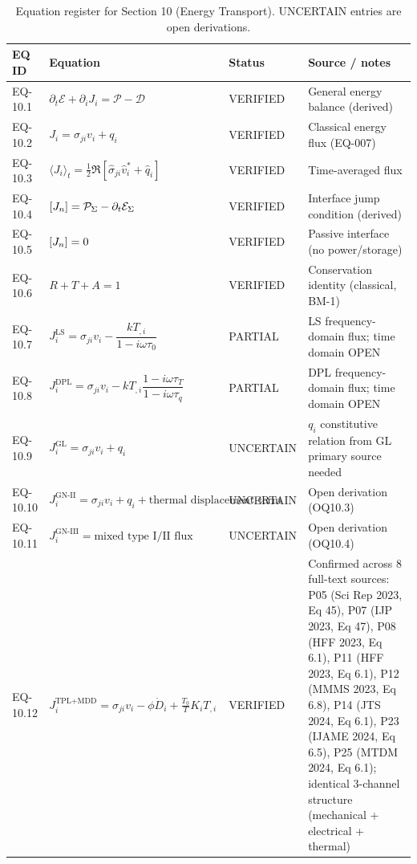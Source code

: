 \begin{table}[h]
\centering
\small
\caption{Equation register for Section 10 (Energy Transport). UNCERTAIN entries are open derivations.}
\label{tab:appA-sec10}
\begin{tabularx}{\textwidth}{@{}lXll@{}}
\toprule
\textbf{EQ ID} & \textbf{Equation} & \textbf{Status} & \textbf{Source / notes} \\
\midrule
EQ-10.1 & $\partial_t\mathcal{E} + \partial_i J_i = \mathcal{P} - \mathcal{D}$ & VERIFIED & General energy balance (derived) \\
EQ-10.2 & $J_i = \sigma_{ji}v_i + q_i$ & VERIFIED & Classical energy flux (EQ-007) \\
EQ-10.3 & $\langle J_i \rangle_t = \tfrac{1}{2}\Re[\hat{\sigma}_{ji}\hat{v}_i^* + \hat{q}_i]$ & VERIFIED & Time-averaged flux \\
EQ-10.4 & $\left[ J_n \right] = \mathcal{P}_\Sigma - \partial_t\mathcal{E}_\Sigma$ & VERIFIED & Interface jump condition (derived) \\
EQ-10.5 & $\left[ J_n \right] = 0$ & VERIFIED & Passive interface (no power/storage) \\
EQ-10.6 & $R + T + A = 1$ & VERIFIED & Conservation identity (classical, BM-1) \\
EQ-10.7 & $J_i^{\text{LS}} = \sigma_{ji}v_i - \dfrac{kT_{,i}}{1-i\omega\tau_0}$ & PARTIAL & LS frequency-domain flux; time domain OPEN \\
EQ-10.8 & $J_i^{\text{DPL}} = \sigma_{ji}v_i - kT_{,i}\dfrac{1-i\omega\tau_T}{1-i\omega\tau_q}$ & PARTIAL & DPL frequency-domain flux; time domain OPEN \\
EQ-10.9 & $J_i^{\text{GL}} = \sigma_{ji}v_i + q_i$ & UNCERTAIN & $q_i$ constitutive relation from GL primary source needed \\
EQ-10.10 & $J_i^{\text{GN-II}} = \sigma_{ji}v_i + q_i + \text{thermal displacement term}$ & UNCERTAIN & Open derivation (OQ10.3) \\
EQ-10.11 & $J_i^{\text{GN-III}} = \text{mixed type I/II flux}$ & UNCERTAIN & Open derivation (OQ10.4) \\
EQ-10.12 & $J_i^{\text{TPL+MDD}} = \sigma_{ji}v_i - \phi\dot{D}_i + \frac{T_0}{T}K_i T_{,i}$ & VERIFIED & Confirmed across 8 full-text sources: P05 (Sci Rep 2023, Eq 45), P07 (IJP 2023, Eq 47), P08 (HFF 2023, Eq 6.1), P11 (HFF 2023, Eq 6.1), P12 (MMMS 2023, Eq 6.8), P14 (JTS 2024, Eq 6.1), P23 (IJAME 2024, Eq 6.5), P25 (MTDM 2024, Eq 6.1); identical 3-channel structure (mechanical + electrical + thermal) \\

\end{tabularx}
\end{table}
